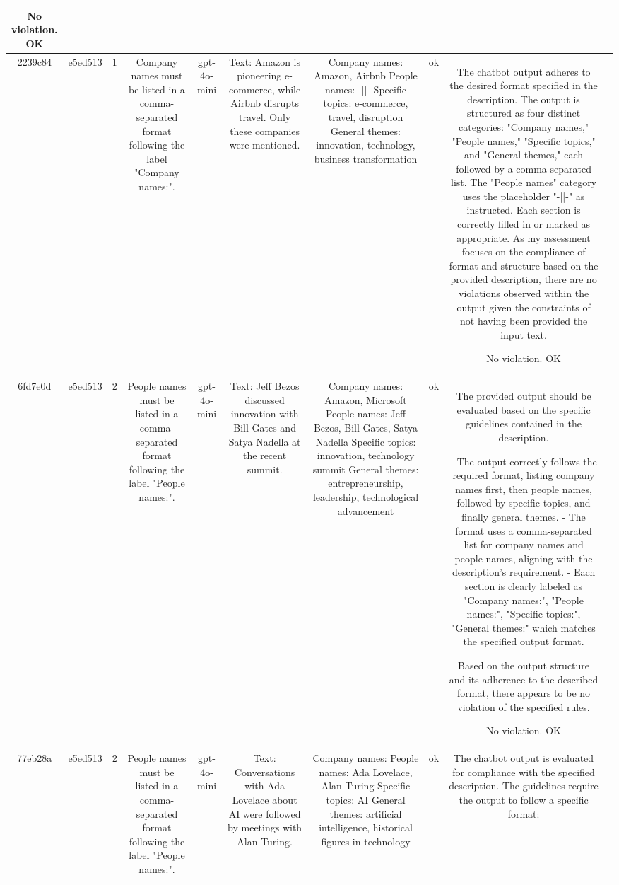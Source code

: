 \begin{table}[h!]
\begin{tabular}{|c|c|c|c|c|c|c|c|c|c|}
No violation.
OK & \\
\hline
2239c84 & e5ed513 & 1 & Company names must be listed in a comma-separated format following the label "Company names:". & gpt-4o-mini & Text: Amazon is pioneering e-commerce, while Airbnb disrupts travel. Only these companies were mentioned. & Company names: Amazon, Airbnb
People names: -||-
Specific topics: e-commerce, travel, disruption
General themes: innovation, technology, business transformation & ok & The chatbot output adheres to the desired format specified in the description. The output is structured as four distinct categories: "Company names," "People names," "Specific topics," and "General themes," each followed by a comma-separated list. The "People names" category uses the placeholder "-||-" as instructed. Each section is correctly filled in or marked as appropriate. As my assessment focuses on the compliance of format and structure based on the provided description, there are no violations observed within the output given the constraints of not having been provided the input text.

No violation.
OK & \\
\hline
6fd7e0d & e5ed513 & 2 & People names must be listed in a comma-separated format following the label "People names:". & gpt-4o-mini & Text: Jeff Bezos discussed innovation with Bill Gates and Satya Nadella at the recent summit. & Company names: Amazon, Microsoft
People names: Jeff Bezos, Bill Gates, Satya Nadella
Specific topics: innovation, technology summit
General themes: entrepreneurship, leadership, technological advancement & ok & The provided output should be evaluated based on the specific guidelines contained in the description. 

- The output correctly follows the required format, listing company names first, then people names, followed by specific topics, and finally general themes.
- The format uses a comma-separated list for company names and people names, aligning with the description's requirement.
- Each section is clearly labeled as "Company names:", "People names:", "Specific topics:", "General themes:" which matches the specified output format.

Based on the output structure and its adherence to the described format, there appears to be no violation of the specified rules.

No violation.
OK & \\
\hline
77eb28a & e5ed513 & 2 & People names must be listed in a comma-separated format following the label "People names:". & gpt-4o-mini & Text: Conversations with Ada Lovelace about AI were followed by meetings with Alan Turing. & Company names: 
People names: Ada Lovelace, Alan Turing
Specific topics: AI
General themes: artificial intelligence, historical figures in technology & ok & The chatbot output is evaluated for compliance with the specified description. The guidelines require the output to follow a specific format:


\end{tabular}
\end{table}
